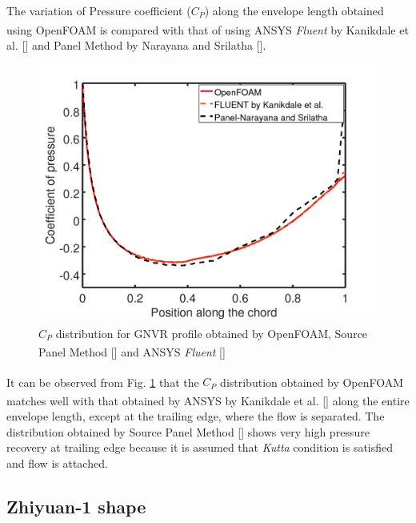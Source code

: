 The variation of Pressure coefficient ($C_{P}$) along the envelope length obtained using OpenFOAM\textsuperscript{\textregistered} is compared with that of using ANSYS\textsuperscript{\textregistered} \textit{Fluent} by Kanikdale et al. [] and Panel Method by Narayana and Srilatha []. 

\begin{figure}[H]
	\centering
	\includegraphics[width=270 pt]{rnd/GNVR_cp.png}
	\caption{$C_{P}$ distribution for GNVR profile obtained by OpenFOAM\textsuperscript{\textregistered}, Source Panel Method [] and ANSYS\textsuperscript{\textregistered} \textit{Fluent} []}
	\label{fig:GNVR pressure distribution} %
\end{figure}

It can be observed from Fig. \ref{fig:GNVR pressure distribution} that the $C_{P}$ distribution obtained by OpenFOAM\textsuperscript{\textregistered} matches well with that obtained by ANSYS\textsuperscript{\textregistered} by Kanikdale et al. [] along the entire envelope length, except at the trailing edge, where the flow is separated. The distribution obtained by Source Panel Method [] shows very high pressure recovery at trailing edge because it is assumed that \textit{Kutta} condition is satisfied and flow is attached.

\subsection{Zhiyuan-1 shape}

